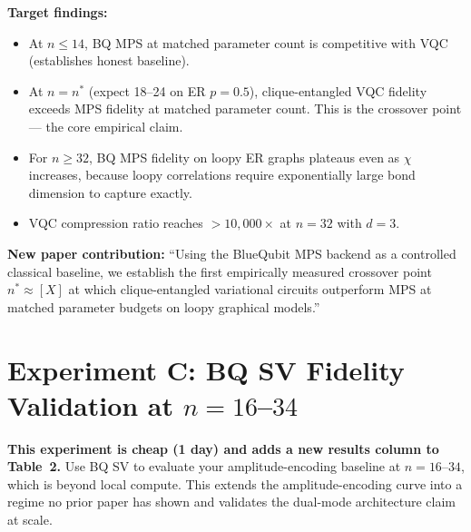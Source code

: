 \documentclass[11pt]{article}
\begin{document}
\begin{notebox}
\textbf{Target findings:}
\begin{itemize}
  \item At $n \leq 14$, BQ MPS at matched parameter count is
        competitive with VQC (establishes honest baseline).
  \item At $n = n^*$ (expect 18--24 on ER $p=0.5$), clique-entangled
        VQC fidelity exceeds MPS fidelity at matched parameter count.
        This is the crossover point --- the core empirical claim.
  \item For $n \geq 32$, BQ MPS fidelity on loopy ER graphs plateaus
        even as $\chi$ increases, because loopy correlations require
        exponentially large bond dimension to capture exactly.
  \item VQC compression ratio reaches $>10{,}000\times$ at $n = 32$
        with $d=3$.
\end{itemize}
\textbf{New paper contribution:} ``Using the BlueQubit MPS backend
as a controlled classical baseline, we establish the first empirically
measured crossover point $n^* \approx [X]$ at which clique-entangled
variational circuits outperform MPS at matched parameter budgets on
loopy graphical models.''
\end{notebox}

\section{Experiment C: BQ SV Fidelity Validation at $n = 16$--$34$}

\textbf{This experiment is cheap (1 day) and adds a new results
column to Table~2.} Use BQ SV to evaluate your amplitude-encoding
baseline at $n = 16$--$34$, which is beyond local compute.
This extends the amplitude-encoding curve into a regime no prior
paper has shown and validates the dual-mode architecture claim
at scale.
\end{document}
